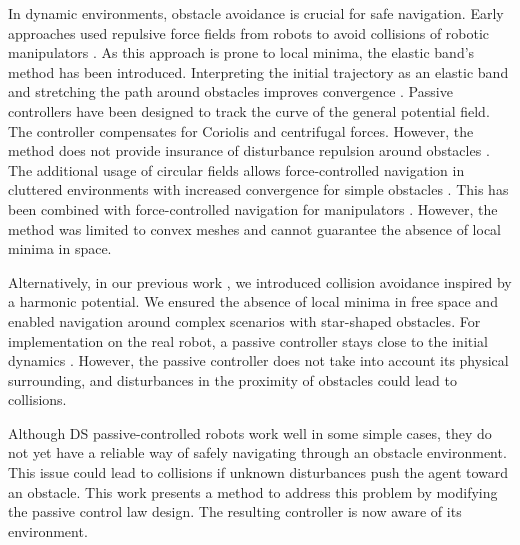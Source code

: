 
In dynamic environments, obstacle avoidance is crucial for safe navigation. Early approaches used repulsive force fields from robots to avoid collisions of robotic manipulators \cite{khatib1987unified}. 
As this approach is prone to local minima, the elastic band's method has been introduced. Interpreting the initial trajectory as an elastic band and stretching the path around obstacles improves convergence  
\cite{
brock2002task, %
brock2002elastic}.
Passive controllers have been designed to track the curve of the general potential field. The controller compensates for Coriolis and centrifugal forces. However, the method does not provide insurance of disturbance repulsion around obstacles \cite{duindam2004passive}. 
The additional usage of circular fields \cite{singh1996real} allows force-controlled navigation in cluttered environments with increased convergence for simple obstacles
\cite{haddadin2011dynamic}.
This has been combined with force-controlled navigation for manipulators \cite{tulbure2020closing}. However, the method was limited to convex meshes and cannot guarantee the absence of local minima in space.

Alternatively, in our previous work \cite{huber2019avoidance, huber2023avoidance}, we introduced collision avoidance inspired by a harmonic potential. We ensured the absence of local minima in free space and enabled navigation around complex scenarios with star-shaped obstacles.
For implementation on the real robot, a passive controller stays close to the initial dynamics \cite{kronander2015passive}. However, the passive controller does not take into account its physical surrounding, and disturbances in the proximity of obstacles could lead to collisions.

Although DS passive-controlled robots work well in some simple cases, they do not yet have a reliable way of safely navigating through an obstacle environment. This issue could lead to collisions if unknown disturbances push the agent toward an obstacle. This work presents a method to address this problem by modifying the passive control law design. The resulting controller is now aware of its environment.

